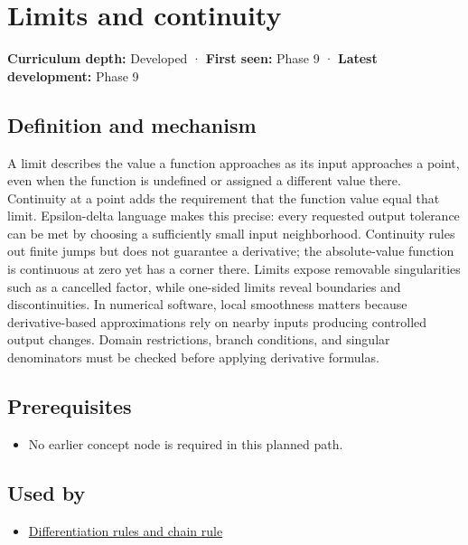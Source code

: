 \hypertarget{appendix-fecc1847f5a3}{}
\section{Limits and continuity}\label{appendix-fecc1847f5a3-limits-and-continuity}

\textbf{Curriculum depth:} Developed · \textbf{First seen:} Phase 9 · \textbf{Latest development:} Phase 9

\subsection{Definition and mechanism}\label{appendix-fecc1847f5a3-definition-and-mechanism}

A limit describes the value a function approaches as its input approaches a point, even when the function is undefined or assigned a different value there. Continuity at a point adds the requirement that the function value equal that limit. Epsilon-delta language makes this precise: every requested output tolerance can be met by choosing a sufficiently small input neighborhood. Continuity rules out finite jumps but does not guarantee a derivative; the absolute-value function is continuous at zero yet has a corner there. Limits expose removable singularities such as a cancelled factor, while one-sided limits reveal boundaries and discontinuities. In numerical software, local smoothness matters because derivative-based approximations rely on nearby inputs producing controlled output changes. Domain restrictions, branch conditions, and singular denominators must be checked before applying derivative formulas.

\subsection{Prerequisites}\label{appendix-fecc1847f5a3-prerequisites}

\begin{itemize}
\tightlist
\item
  No earlier concept node is required in this planned path.
\end{itemize}

\subsection{Used by}\label{appendix-fecc1847f5a3-used-by}

\begin{itemize}
\tightlist
\item
  \hyperref[appendix-d9f70bdfbc92]{Differentiation rules and chain rule}
\end{itemize}

